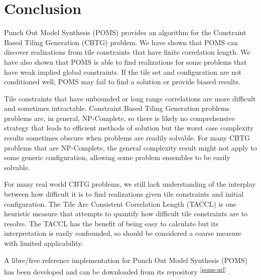 \section{Conclusion}

Punch Out Model Synthesis (POMS) provides an algorithm for the Constraint Based Tiling Generation (CBTG) problem.
We have shown that POMS can discover realizations from tile constraints that have finite correlation length.
We have also shown that POMS is able to find realizations for some problems
that have weak implied global constraints.
If the tile set and configuration are not conditioned well,
POMS may fail to find a solution or provide biased results.

Tile constraints that have unbounded or long range correlations are more difficult and sometimes intractable.
Constraint Based Tiling Generation problems problems are, in general, NP-Complete, so there is likely
no comprehensive strategy that leads to efficient methods of solution but the worst case complexity
results sometimes obscure when problems are readily solvable.
For many CBTG problems that are NP-Complete, the general complexity result might not
apply to some generic configuration, allowing some problem ensembles
to be easily solvable.

For many real world CBTG problems, we still lack understanding of the
interplay between how difficult it is to find realizations given tile constraints
and initial configuration.
The Tile Arc Consistent Correlation Length (TACCL) is one heuristic measure that attempts
to quantify how difficult tile constraints are to resolve.
The TACCL has the benefit of being easy to calculate but its interpretation is easily confounded,
so should be considered a coarse measure with limited applicability.

A libre/free reference implementation for Punch Out Model Synthesis (POMS) has been developed and can be downloaded
from its repository \textsuperscript{ \ref{poms-url} }.

